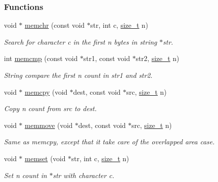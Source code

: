 \subsubsection*{Functions}
\begin{DoxyCompactItemize}
\item 
void $\ast$ \mbox{\hyperlink{a00038_af2c756015b1cb92274fc019a175ae8bb}{memchr}} (const void $\ast$str, int c, \mbox{\hyperlink{a00038_a43b4547e12226fef871eed8afe191ad7}{size\+\_\+t}} n)
\begin{DoxyCompactList}\small\item\em Search for character c in the first n bytes in string $\ast$str. \end{DoxyCompactList}\item 
int \mbox{\hyperlink{a00038_ace6c4869ab3af01c6f27eac47773917a}{memcmp}} (const void $\ast$str1, const void $\ast$str2, \mbox{\hyperlink{a00038_a43b4547e12226fef871eed8afe191ad7}{size\+\_\+t}} n)
\begin{DoxyCompactList}\small\item\em String compare the first n count in str1 and str2. \end{DoxyCompactList}\item 
void $\ast$ \mbox{\hyperlink{a00038_a14938524dcbeb59d7117ba5e151ad1b1}{memcpy}} (void $\ast$dest, const void $\ast$src, \mbox{\hyperlink{a00038_a43b4547e12226fef871eed8afe191ad7}{size\+\_\+t}} n)
\begin{DoxyCompactList}\small\item\em Copy n count from src to dest. \end{DoxyCompactList}\item 
void $\ast$ \mbox{\hyperlink{a00038_a802c986820d3866639922b6bc9484f90}{memmove}} (void $\ast$dest, const void $\ast$src, \mbox{\hyperlink{a00038_a43b4547e12226fef871eed8afe191ad7}{size\+\_\+t}} n)
\begin{DoxyCompactList}\small\item\em Same as memcpy, except that it take care of the overlapped area case. \end{DoxyCompactList}\item 
void $\ast$ \mbox{\hyperlink{a00038_a48a16bf628904bdd1b28cbaedf934868}{memset}} (void $\ast$str, int c, \mbox{\hyperlink{a00038_a43b4547e12226fef871eed8afe191ad7}{size\+\_\+t}} n)
\begin{DoxyCompactList}\small\item\em Set n count in $\ast$str with character c. \end{DoxyCompactList}\item 

\end{DoxyCompactItemize}
